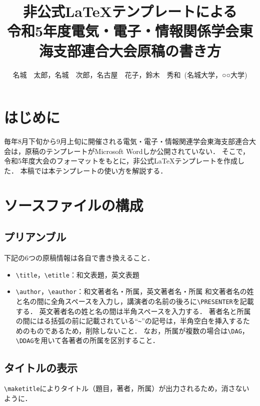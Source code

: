 \documentclass[a4j,9pt,twocolumn,uplatex]{jsarticle}
\title{非公式\LaTeX テンプレートによる\\令和5年度電気・電子・情報関係学会東海支部連合大会原稿の書き方}
\author{名城　太郎\DAG\PRESENTER，名城　次郎\DAG，名古屋　花子\DDAG，鈴木　秀和\DAG~(\DAG 名城大学，\DDAG ○○大学)}
\begin{document}
\maketitle		%

\setlength{\baselineskip}{14pt} %


\section{はじめに}

毎年8月下旬から9月上旬に開催される電気・電子・情報関連学会東海支部連合大会は，原稿のテンプレートがMicrosoft Wordしか公開されていない．
そこで，令和5年度大会のフォーマットをもとに，非公式\LaTeX テンプレートを作成した．
本稿では本テンプレートの使い方を解説する．


\section{ソースファイルの構成}

\subsection{プリアンブル}
下記の6つの原稿情報は各自で書き換えること．
\begin{itemize}
    \item \verb|\title|，\verb|\etitle|：和文表題，英文表題
    \item \verb|\author|，\verb|\eauthor|：和文著者名・所属，英文著者名・所属
    和文著者名の姓と名の間に全角スペースを入力し，講演者の名前の後ろに\verb|\PRESENTER|を記載する．
    英文著者名の姓と名の間は半角スペースを入力する．
    著者名と所属の間にはる括弧の前に記載されている``\verb|~|''の記号は，半角空白を挿入するためのものであるため，削除しないこと．
    なお，所属が複数の場合は\verb|\DAG|，\verb|\DDAG|を用いて各著者の所属を区別すること．
\end{itemize}

\subsection{タイトルの表示}
\verb|\maketitle|によりタイトル（題目，著者，所属）が出力されるため，消さないように．
\end{document}
